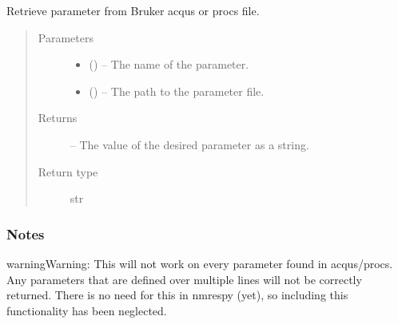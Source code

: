 \documentclass[letterpaper,10pt,english]{sphinxmanual}
\begin{document}
\begin{fulllineitems}
\label{\detokenize{references/load:nmrespy.load._get_param}}
\sphinxAtStartPar
Retrieve parameter from Bruker acqus or procs file.
\begin{quote}\begin{description}
\item[{Parameters}] \leavevmode\begin{itemize}
\item {} 
\sphinxAtStartPar
{} () – The name of the parameter.

\item {} 
\sphinxAtStartPar
{} () – The path to the parameter file.

\end{itemize}

\item[{Returns}] \leavevmode
\sphinxAtStartPar
{} – The value of the desired parameter as a string.

\item[{Return type}] \leavevmode
\sphinxAtStartPar
str

\end{description}\end{quote}
\subsubsection*{Notes}

\begin{sphinxadmonition}{warning}{Warning:}
\sphinxAtStartPar
This will not work on every parameter found in acqus/procs.
Any parameters that are defined over multiple lines will not
be correctly returned. There is no need for this in nmrespy (yet),
so including this functionality has been neglected.
\end{sphinxadmonition}

\end{fulllineitems}

\end{document}
